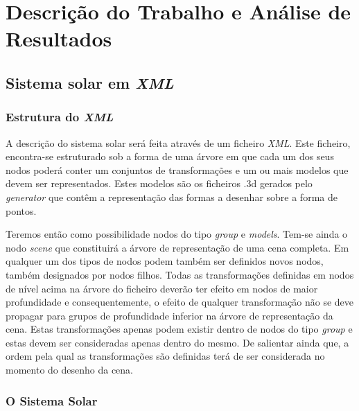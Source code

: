 \documentclass[a4paper]{article}
\begin{document}
\section{Descrição do Trabalho e Análise de Resultados}

\subsection{Sistema solar em \emph{XML}} 

\subsubsection{Estrutura do \emph{XML}}

\hspace{3mm} A descrição do sistema solar será feita através de um ficheiro \emph{XML}. Este ficheiro, encontra-se estruturado sob a forma de uma árvore em que cada um dos seus nodos poderá conter um conjuntos de transformações e um ou mais modelos que devem ser representados. Estes modelos são os ficheiros .3d gerados pelo \emph{generator} que contêm a representação das formas a desenhar sobre a forma de pontos.

\par Teremos então como possibilidade nodos do tipo \emph{group} e \emph{models}. Tem-se ainda o nodo \emph{scene} que constituirá a árvore de representação de uma cena completa. Em qualquer um dos tipos de nodos podem também ser definidos novos nodos, também designados por nodos filhos. Todas as transformações definidas em nodos de nível acima na árvore do ficheiro deverão ter efeito em nodos de maior profundidade e consequentemente, o efeito de qualquer transformação não se deve propagar para grupos de profundidade inferior na árvore de representação da cena. Estas transformações apenas podem existir dentro de nodos do tipo \emph{group} e estas devem ser consideradas apenas dentro do mesmo. De salientar ainda que, a ordem pela qual as transformações são definidas terá de ser considerada no momento do desenho da cena.

\subsubsection{O Sistema Solar}



\end{document}
